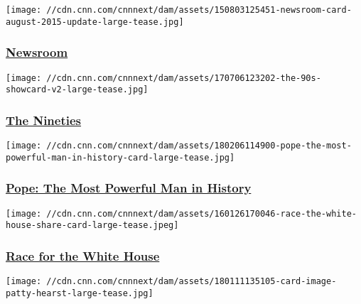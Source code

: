 \href{/shows/newsroom}{}

\texttt{[image: //cdn.cnn.com/cnnnext/dam/assets/150803125451-newsroom-card-august-2015-update-large-tease.jpg]}

\hypertarget{newsroom}{%
\subsubsection{\texorpdfstring{\href{/shows/newsroom}{Newsroom}}{Newsroom}}\label{newsroom}}

\href{/shows/the-nineties}{}

\texttt{[image: //cdn.cnn.com/cnnnext/dam/assets/170706123202-the-90s-showcard-v2-large-tease.jpg]}

\hypertarget{the-nineties}{%
\subsubsection{\texorpdfstring{\href{/shows/the-nineties}{The
Nineties}}{The Nineties}}\label{the-nineties}}

\href{/shows/pope}{}

\texttt{[image: //cdn.cnn.com/cnnnext/dam/assets/180206114900-pope-the-most-powerful-man-in-history-card-large-tease.jpg]}

\hypertarget{pope-the-most-powerful-man-in-history}{%
\subsubsection{\texorpdfstring{\href{/shows/pope}{Pope: The Most
Powerful Man in
History}}{Pope: The Most Powerful Man in History}}\label{pope-the-most-powerful-man-in-history}}

\href{/shows/race-for-the-white-house}{}

\texttt{[image: //cdn.cnn.com/cnnnext/dam/assets/160126170046-race-the-white-house-share-card-large-tease.jpeg]}

\hypertarget{race-for-the-white-house}{%
\subsubsection{\texorpdfstring{\href{/shows/race-for-the-white-house}{Race
for the White
House}}{Race for the White House}}\label{race-for-the-white-house}}

\href{/shows/radical-story-patty-hearst}{}

\texttt{[image: //cdn.cnn.com/cnnnext/dam/assets/180111135105-card-image-patty-hearst-large-tease.jpg]}


